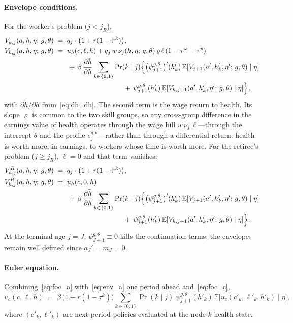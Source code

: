 \documentclass[12pt,a4paper]{article}
\newcommand{\E}{\mathbb{E}}
\begin{document}
\begin{appendices}
\paragraph{Envelope conditions.} For the worker's problem ($j < j_R$),
\begin{align}
V_{a, j}(a, h, \eta;\, g, \theta) &\;=\; q_j \cdot \bigl(1 + r(1-\tau^k)\bigr), \label{eq:env_a}\\
V_{h, j}(a, h, \eta;\, g, \theta) &\;=\; u_h(c, \ell, h) + q_j\, w\, \nu_j(h, \eta;\, g, \theta)\, \varrho\, \ell\, (1-\tau^\omega-\tau^p) \notag\\
&\qquad +\, \beta\, \frac{\partial \tilde h}{\partial h} \sum_{k \in \{0,1\}} \Pr(k \mid j)\Bigl\{ \bigl(\psi_{j+1}^{g,\theta}\bigr)'(h'_k)\, \E[V_{j+1}(a', h'_k, \eta';\, g, \theta) \mid \eta] \notag\\
&\qquad\qquad\qquad\qquad\qquad +\, \psi_{j+1}^{g,\theta}(h'_k)\, \E[V_{h, j+1}(a', h'_k, \eta';\, g, \theta) \mid \eta] \Bigr\}, \label{eq:env_h}
\end{align}
with $\partial \tilde h / \partial h$ from~\eqref{eq:dh_dh}. The second term is the wage return to health. Its slope $\varrho$ is common to the two skill groups, so any cross-group difference in the earnings value of health operates through the wage bill $w\,\nu_j\,\ell$---through the intercept $\theta$ and the profile $e^{g,\theta}_j$---rather than through a differential return: health is worth more, in earnings, to workers whose time is worth more. For the retiree's problem ($j \geq j_R$), $\ell = 0$ and that term vanishes:
\begin{align}
V_{a, j}^{R}(a, h, \eta;\, g, \theta) &\;=\; q_j \cdot \bigl(1 + r(1-\tau^k)\bigr), \label{eq:env_a_ret}\\
V_{h, j}^{R}(a, h, \eta;\, g, \theta) &\;=\; u_h(c, 0, h) \notag\\
&\qquad +\, \beta\, \frac{\partial \tilde h}{\partial h} \sum_{k \in \{0,1\}} \Pr(k \mid j)\Bigl\{ \bigl(\psi_{j+1}^{g,\theta}\bigr)'(h'_k)\, \E[V_{j+1}(a', h'_k, \eta';\, g, \theta) \mid \eta] \notag\\
&\qquad\qquad\qquad\qquad\qquad +\, \psi_{j+1}^{g,\theta}(h'_k)\, \E[V_{h, j+1}(a', h'_k, \eta';\, g, \theta) \mid \eta] \Bigr\}. \label{eq:env_h_ret}
\end{align}
At the terminal age $j = J$, $\psi^{g,\theta}_{J+1} \equiv 0$ kills the continuation terms; the envelopes remain well defined since $a_J' = m_J = 0$.

\paragraph{Euler equation.} Combining~\eqref{eq:foc_a} with~\eqref{eq:env_a} one period ahead and~\eqref{eq:foc_c},
\begin{equation}
\label{eq:euler}
u_c(c, \ell, h) \;=\; \beta\, \bigl(1 + r(1-\tau^k)\bigr) \sum_{k \in \{0,1\}} \Pr(k \mid j)\; \psi_{j+1}^{g,\theta}(h'_k)\, \E\bigl[u_c(c'_k, \ell'_k, h'_k) \mid \eta\bigr],
\end{equation}
where $(c'_k, \ell'_k)$ are next-period policies evaluated at the node-$k$ health state.


\end{appendices}
\end{document}
